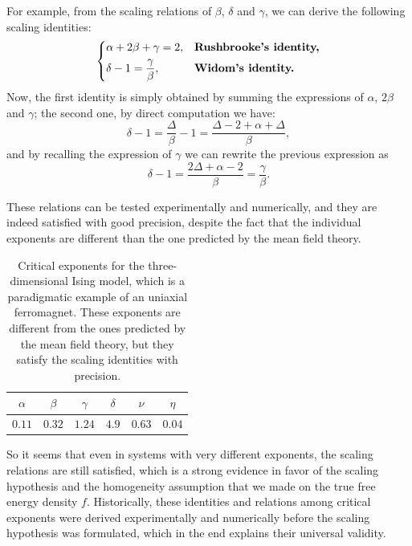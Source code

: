 For example, from the scaling relations of \(\beta\), \(\delta\) and \(\gamma\), we can derive the following scaling identities:
\[
    \begin{dcases}
        \alpha + 2\beta + \gamma = 2,      & \textbf{Rushbrooke's identity,} \\
        \delta - 1 = \frac{\gamma}{\beta}, & \textbf{Widom's identity.}      \\
    \end{dcases}
\]
Now, the first identity is simply obtained by summing the expressions of \(\alpha\), \(2\beta\) and \(\gamma\); the second one, by direct computation we have:
\[
    \delta - 1 = \frac{\Delta}{\beta} - 1 = \frac{\Delta - 2 + \alpha + \Delta}{\beta},
\]
and by recalling the expression of \(\gamma\) we can rewrite the previous expression as
\[
    \delta - 1 = \frac{2\Delta + \alpha - 2}{\beta} = \frac{\gamma}{\beta}.
\]

These relations can be tested experimentally and numerically, and they are indeed satisfied with good precision, despite the fact that the individual exponents are different than the one predicted by the mean field theory.

\begin{table}[H]
    \centering
    \setlength{\tabcolsep}{16pt}
    \begin{tabular}{c c c c c c}
        \toprule
        $\alpha$ & $\beta$ & $\gamma$ & $\delta$ & $\nu$  & $\eta$ \\
        \midrule
        $0.11$   & $0.32$  & $1.24$   & $4.9$    & $0.63$ & $0.04$ \\
        \bottomrule
    \end{tabular}
    \caption{Critical exponents for the three-dimensional Ising model, which is a paradigmatic example of an uniaxial ferromagnet. These exponents are different from the ones predicted by the mean field theory, but they satisfy the scaling identities with precision.}
    \label{tab:critical_exponents_uniaxial_ferromagnet_3d}
\end{table}

So it seems that even in systems with very different exponents, the scaling relations are still satisfied, which is a strong evidence in favor of the scaling hypothesis and the homogeneity assumption that we made on the true free energy density \(f\). Historically, these identities and relations among critical exponents were derived experimentally and numerically before the scaling hypothesis was formulated, which in the end explains their universal validity.

